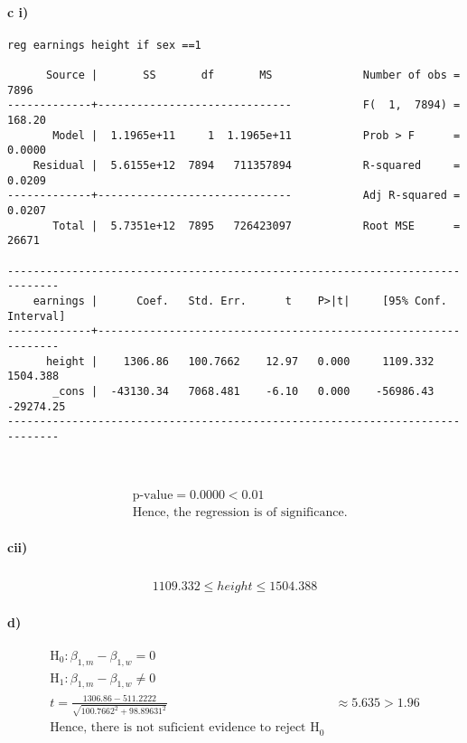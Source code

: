 \documentclass[letterpaper,12pt,titlepage,oneside,final]{book}
\begin{document}
\paragraph{c i)}
\begin{verbatim}
reg earnings height if sex ==1

      Source |       SS       df       MS              Number of obs =    7896
-------------+------------------------------           F(  1,  7894) =  168.20
       Model |  1.1965e+11     1  1.1965e+11           Prob > F      =  0.0000
    Residual |  5.6155e+12  7894   711357894           R-squared     =  0.0209
-------------+------------------------------           Adj R-squared =  0.0207
       Total |  5.7351e+12  7895   726423097           Root MSE      =   26671

------------------------------------------------------------------------------
    earnings |      Coef.   Std. Err.      t    P>|t|     [95% Conf. Interval]
-------------+----------------------------------------------------------------
      height |    1306.86   100.7662    12.97   0.000     1109.332    1504.388
       _cons |  -43130.34   7068.481    -6.10   0.000    -56986.43   -29274.25
------------------------------------------------------------------------------



\end{verbatim}

\begin{align*}
&\text{p-value} =  0.0000 < 0.01\\
&\text{Hence, the regression is of significance.}
\end{align*}

\paragraph{cii)}
\begin{align*}
1109.332 \leq \widehat{height} \leq 1504.388
\end{align*}

\paragraph{d)}
\begin{align*}
\text{H}_0 : \beta_{1,m} - \beta_{1,w} = 0 \\
\text{H}_1 : \beta_{1,m} - \beta_{1,w} \neq 0\\
t = \frac{1306.86 - 511.2222}{\sqrt{100.7662^2 + 98.89631^2}} &\approx 5.635 > 1.96\\
\text{Hence, there is not suficient evidence to reject H}_0 
\end{align*}
\end{document}
